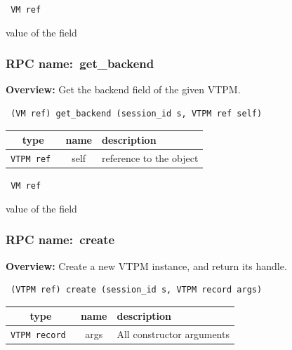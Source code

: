 \vspace{0.3cm}

{\tt 
VM ref
}


value of the field
\vspace{0.3cm}
\vspace{0.3cm}
\vspace{0.3cm}
\subsubsection{RPC name:~get\_backend}

{\bf Overview:} 
Get the backend field of the given VTPM.

\begin{verbatim} (VM ref) get_backend (session_id s, VTPM ref self)\end{verbatim}



 
\vspace{0.3cm}
\begin{tabular}{|c|c|p{7cm}|}
 \hline
{\bf type} & {\bf name} & {\bf description} \\ \hline
{\tt VTPM ref } & self & reference to the object \\ \hline 

\end{tabular}

\vspace{0.3cm}

{\tt 
VM ref
}


value of the field
\vspace{0.3cm}
\vspace{0.3cm}
\vspace{0.3cm}
\subsubsection{RPC name:~create}

{\bf Overview:} 
Create a new VTPM instance, and return its handle.

\begin{verbatim} (VTPM ref) create (session_id s, VTPM record args)\end{verbatim}



 
\vspace{0.3cm}
\begin{tabular}{|c|c|p{7cm}|}
 \hline
{\bf type} & {\bf name} & {\bf description} \\ \hline
{\tt VTPM record } & args & All constructor arguments \\ \hline 

\end{tabular}

